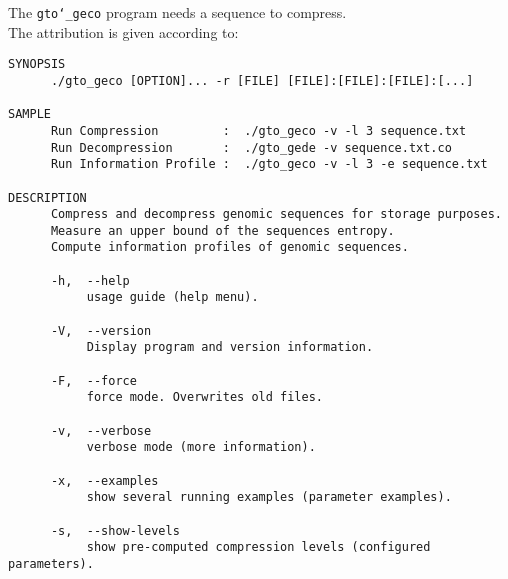 The \texttt{gto\char`_geco} program needs a sequence to compress.\\
The attribution is given according to:
\begin{lstlisting}
SYNOPSIS                                                                
      ./gto_geco [OPTION]... -r [FILE] [FILE]:[FILE]:[FILE]:[...]          
                                                                        
SAMPLE                                                                  
      Run Compression         :  ./gto_geco -v -l 3 sequence.txt           
      Run Decompression       :  ./gto_gede -v sequence.txt.co             
      Run Information Profile :  ./gto_geco -v -l 3 -e sequence.txt        
                                                                        
DESCRIPTION                                                             
      Compress and decompress genomic sequences for storage purposes.   
      Measure an upper bound of the sequences entropy.                  
      Compute information profiles of genomic sequences.                
                                                                        
      -h,  --help                                                       
           usage guide (help menu).                                     
                                                                        
      -V,  --version                                                    
           Display program and version information.                     
                                                                        
      -F,  --force                                                      
           force mode. Overwrites old files.                            
                                                                        
      -v,  --verbose                                                    
           verbose mode (more information).                             
                                                                        
      -x,  --examples                                                   
           show several running examples (parameter examples).          
                                                                        
      -s,  --show-levels                                                
           show pre-computed compression levels (configured parameters).
                                                                        

\end{lstlisting}
